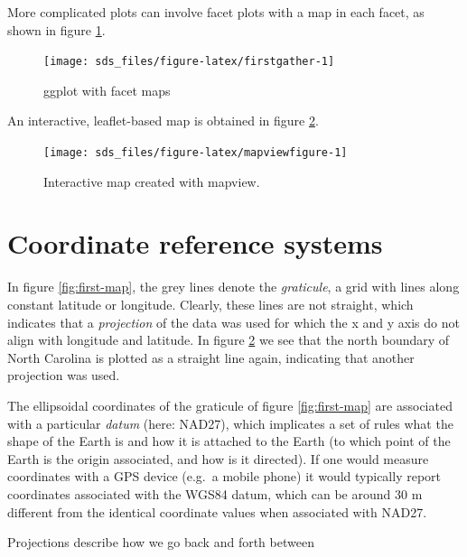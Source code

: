 \documentclass[]{book}
\begin{document}
More complicated plots can involve facet plots with a map in each
facet, as shown in figure \ref{fig:firstgather}.

\begin{figure}

{\centering \texttt{[image: sds\_files/figure-latex/firstgather-1]} 

}

\caption{ggplot with facet maps}\label{fig:firstgather}
\end{figure}

An interactive, leaflet-based map is obtained in figure \ref{fig:mapviewfigure}.

\begin{figure}

{\centering \texttt{[image: sds\_files/figure-latex/mapviewfigure-1]} 

}

\caption{Interactive map created with mapview.}\label{fig:mapviewfigure}
\end{figure}

\hypertarget{coordinate-reference-systems}{%
\section{Coordinate reference systems}\label{coordinate-reference-systems}}

In figure \ref{fig:first-map}, the grey lines denote the
\emph{graticule}, a grid with lines along constant latitude
or longitude. Clearly, these lines are not straight, which
indicates that a \emph{projection} of the data was used for which the
x and y axis do not align with longitude and latitude. In figure
\ref{fig:mapviewfigure} we see that the north boundary of North
Carolina is plotted as a straight line again, indicating that
another projection was used.

The ellipsoidal coordinates of the graticule of figure
\ref{fig:first-map} are associated with a particular \emph{datum}
(here: NAD27), which implicates a set of rules what the shape of the
Earth is and how it is attached to the Earth (to which point of the
Earth is the origin associated, and how is it directed). If one
would measure coordinates with a GPS device (e.g.~a mobile phone)
it would typically report coordinates associated with the WGS84
datum, which can be around 30 m different from the identical
coordinate values when associated with NAD27.

Projections describe how we go back and forth between
\end{document}
